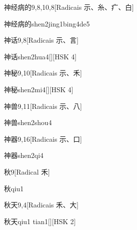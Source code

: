\begin{entry}{神经病的}{9,8,10,8}[Radicais ⽰、⽷、⽧、⽩]
  \begin{phonetics}{神经病的}{shen2jing1bing4de5}
  \end{phonetics}
\end{entry}

\begin{entry}{神话}{9,8}[Radicais ⽰、⾔]
  \begin{phonetics}{神话}{shen2hua4}[][HSK 4]
  \end{phonetics}
\end{entry}

\begin{entry}{神秘}{9,10}[Radicais ⽰、⽲]
  \begin{phonetics}{神秘}{shen2mi4}[][HSK 4]
  \end{phonetics}
\end{entry}

\begin{entry}{神兽}{9,11}[Radicais ⽰、⼋]
  \begin{phonetics}{神兽}{shen2shou4}
  \end{phonetics}
\end{entry}

\begin{entry}{神器}{9,16}[Radicais ⽰、⼝]
  \begin{phonetics}{神器}{shen2qi4}
  \end{phonetics}
\end{entry}

\begin{entry}{秋}{9}[Radical ⽲]
  \begin{phonetics}{秋}{qiu1}
  \end{phonetics}
\end{entry}

\begin{entry}{秋天}{9,4}[Radicais ⽲、⼤]
  \begin{phonetics}{秋天}{qiu1 tian1}[][HSK 2]
  \end{phonetics}
\end{entry}

